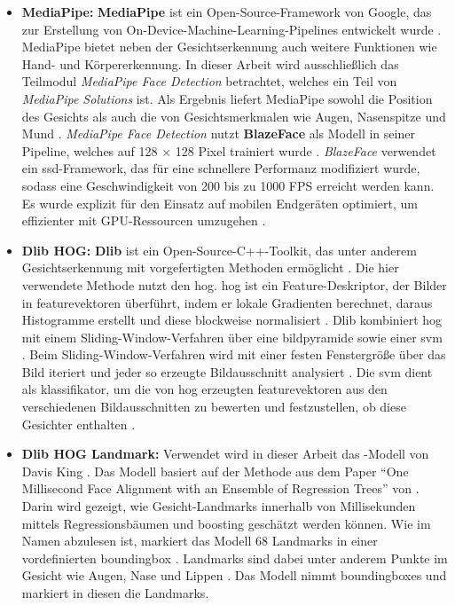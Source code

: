\begin{itemize}
%	
	\item \textbf{MediaPipe:} \textbf{MediaPipe} ist ein Open-Source-Framework von Google, das zur Erstellung von On-Device-Machine-Learning-Pipelines entwickelt wurde \parencite{mediapipeFramework, mediapipeSolutions}. MediaPipe bietet neben der Gesichtserkennung auch weitere Funktionen wie Hand- und Körpererkennung. In dieser Arbeit wird ausschließlich das Teilmodul \textit{MediaPipe Face Detection} betrachtet, welches ein Teil von \textit{MediaPipe Solutions} ist. Als Ergebnis liefert MediaPipe sowohl die Position des Gesichts als auch die von Gesichtsmerkmalen wie Augen, Nasenspitze und Mund \parencite{mediapipeFace}. \textit{MediaPipe Face Detection} nutzt \textbf{BlazeFace} als Modell in seiner Pipeline, welches auf 128 × 128 Pixel trainiert wurde \parencite{mediapipeFace}. \textit{BlazeFace} verwendet ein \gls{ssd}-Framework, das für eine schnellere Performanz modifiziert wurde, sodass eine Geschwindigkeit von 200 bis zu 1000 FPS erreicht werden kann. Es wurde explizit für den Einsatz auf mobilen Endgeräten optimiert, um effizienter mit GPU-Ressourcen umzugehen \parencite{Bazarevsky2019}.
%	
	\item \textbf{Dlib HOG:} \textbf{Dlib} ist ein Open-Source-C++-Toolkit, das unter anderem Gesichtserkennung mit vorgefertigten Methoden ermöglicht \parencite{dlib2022}. Die hier verwendete Methode \texttt{} nutzt den \gls{hog}. \gls{hog} ist ein Feature-Deskriptor, der Bilder in \gls{featurevektor}en überführt, indem er lokale Gradienten berechnet, daraus Histogramme erstellt und diese blockweise normalisiert \parencite{1467360}. Dlib kombiniert \gls{hog} mit einem Sliding-Window-Verfahren über eine \gls{bildpyramide} sowie einer \gls{svm} \parencite{trainObjectDetectoroD, faceDetectoroD}. Beim Sliding-Window-Verfahren wird mit einer festen Fenstergröße über das Bild iteriert und jeder so erzeugte Bildausschnitt analysiert \parencite{Esri2025SSD}. Die \gls{svm} dient als \gls{klassifikator}, um die von \gls{hog} erzeugten \gls{featurevektor}en aus den verschiedenen Bildausschnitten zu bewerten und festzustellen, ob diese Gesichter enthalten \parencite{1467360}.
%	
	\item \textbf{Dlib HOG Landmark:} Verwendet wird in dieser Arbeit das -Modell von Davis King \parencite{King24}. Das Modell basiert auf der Methode aus dem Paper ``One Millisecond Face Alignment with an Ensemble of Regression Trees'' von \cite{Kazemi2014} \parencite{faceLandmarkDetectionoD}. Darin wird gezeigt, wie Gesicht-Landmarks innerhalb von Millisekunden mittels Regressionsbäumen und \gls{boosting} geschätzt werden können. Wie im Namen abzulesen ist, markiert das Modell 68 Landmarks in einer vordefinierten \gls{boundingbox} \parencite{DlibPythonoD}. Landmarks sind dabei unter anderem Punkte im Gesicht wie Augen, Nase und Lippen \parencite{faceLandmarkDetectionoD}. Das Modell nimmt \gls{boundingbox}es und markiert in diesen die Landmarks.

\end{itemize}
